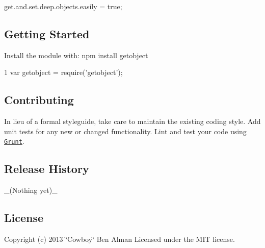 get.\+and.\+set.\+deep.\+objects.\+easily = true;

\subsection*{Getting Started}

Install the module with\+: {\ttfamily npm install getobject}


\begin{DoxyCode}
1 var getobject = require('getobject');
\end{DoxyCode}


\subsection*{Contributing}

In lieu of a formal styleguide, take care to maintain the existing coding style. Add unit tests for any new or changed functionality. Lint and test your code using \href{http://gruntjs.com/}{\tt Grunt}.

\subsection*{Release History}

\+\_\+(\+Nothing yet)\+\_\+

\subsection*{License}

Copyright (c) 2013 \char`\"{}\+Cowboy\char`\"{} Ben Alman Licensed under the M\+I\+T license. 
